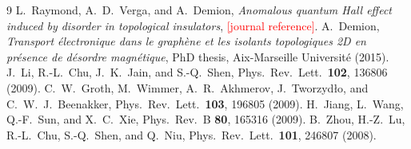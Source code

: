\documentclass[11pt,a4paper]{article}
\newcommand{\todo}[1]{\textcolor{red}{[#1]}}
\begin{document}
\begin{thebibliography}{9}
 L.~Raymond, A.~D.~Verga, and A.~Demion, \emph{Anomalous quantum Hall effect induced
  by disorder in topological insulators}, \todo{journal reference}.
 A.~Demion, \emph{Transport électronique dans le graphène et les isolants
  topologiques 2D en présence de désordre magnétique}, PhD thesis, Aix-Marseille Université
  (2015).
 J.~Li, R.-L.~Chu, J.~K.~Jain, and S.-Q.~Shen, Phys.\ Rev.\ Lett.\ \textbf{102},
  136806 (2009).
 C.~W.~Groth, M.~Wimmer, A.~R.~Akhmerov, J.~Tworzyd\l{}o, and
  C.~W.~J.~Beenakker, Phys.\ Rev.\ Lett.\ \textbf{103}, 196805 (2009).
 H.~Jiang, L.~Wang, Q.-F.~Sun, and X.~C.~Xie, Phys.\ Rev.\ B \textbf{80},
  165316 (2009).
 B.~Zhou, H.-Z.~Lu, R.-L.~Chu, S.-Q.~Shen, and Q.~Niu, Phys.\ Rev.\ Lett.\
  \textbf{101}, 246807 (2008).
\end{thebibliography}
\end{document}
